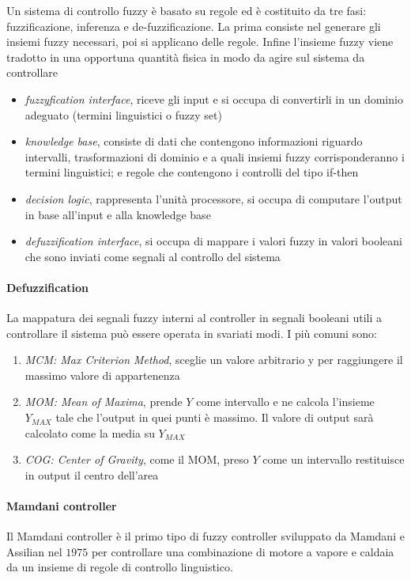 Un sistema di controllo fuzzy è basato su regole ed è costituito da tre fasi: fuzzificazione, inferenza e de-fuzzificazione. La prima consiste nel generare gli insiemi fuzzy necessari, poi si applicano delle regole. Infine l'insieme fuzzy viene tradotto in una opportuna quantità fisica in modo da agire sul sistema da controllare

\begin{itemize}
    \item \textit{fuzzyfication interface}, riceve gli input e si occupa di convertirli in un dominio adeguato (termini linguistici o fuzzy set)
    \item \textit{knowledge base}, consiste di dati che contengono informazioni riguardo intervalli, trasformazioni di dominio e a quali insiemi fuzzy corrisponderanno i termini linguistici; e regole che contengono i controlli del tipo if-then
    \item \textit{decision logic}, rappresenta l’unità processore, si occupa di computare l’output in base all’input e alla knowledge base
    \item \textit{defuzzification interface}, si occupa di mappare i valori fuzzy in valori booleani che sono inviati come segnali al controllo del sistema
\end{itemize}

\paragraph{Defuzzification}
La mappatura dei segnali fuzzy interni al controller in segnali booleani utili a controllare il sistema può essere operata in svariati modi. I più comuni sono:
\begin{enumerate}
    \item \textit{MCM: Max Criterion Method}, sceglie un valore arbitrario y per raggiungere il massimo valore di appartenenza
    \item \textit{MOM: Mean of Maxima}, prende $Y$ come intervallo e ne calcola l’insieme $Y_{MAX}$ tale che l’output in quei punti è massimo. Il valore di output sarà calcolato come la media su $Y_{MAX}$
    \item \textit{COG: Center of Gravity}, come il MOM, preso $Y$ come un intervallo restituisce in output il centro dell’area
\end{enumerate}

\paragraph{Mamdani controller}
Il Mamdani controller è il primo tipo di fuzzy controller sviluppato da Mamdani e Assilian nel $1975$ per controllare una combinazione di motore a vapore e caldaia da un insieme di regole di controllo linguistico. 

